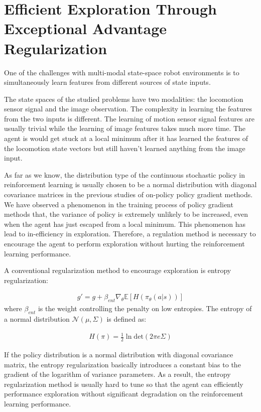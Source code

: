 \section{Efficient Exploration Through Exceptional Advantage Regularization}\label{sec_method_expadv_reg}
One of the challenges with multi-modal state-space robot environments is to simultaneously learn features from different sources of state inputs.

The state spaces of the studied problems have two modalities: the locomotion sensor signal and the image observation. The complexity in learning the features from the two inputs is different. The learning of motion sensor signal features are usually trivial while the learning of image features takes much more time. The agent is would get stuck at a local minimum after it has learned the features of the locomotion state vectors but still haven't learned anything from the image input.

As far as we know, the distribution type of the continuous stochastic policy in reinforcement learning is usually chosen to be a normal distribution with diagonal covariance matrices in the previous studies of on-policy policy gradient methods. We have observed a phenomenon in the training process of policy gradient methods that, the variance of policy is extremely unlikely to be increased, even when the agent has just escaped from a local minimum. This phenomenon has lead to in-efficiency in exploration. Therefore, a regulation method is necessary to encourage the agent to perform exploration without hurting the reinforcement learning performance.

A conventional regularization method to encourage exploration is entropy regularization:

\begin{align}
g' = g +\beta_{ent}\nabla_\theta \mathbb{E}[ H(\pi_\theta(a|s)) ]
\end{align}
where $\beta_{ent}$ is the weight controlling the penalty on low entropies.
The entropy of a normal distribution $\mathcal{N}(\mu,\Sigma)$ is defined as:

\begin{align}
	H(\pi) =  \frac{1}{2} \ln \mathrm{det}(2\pi e \Sigma)
\end{align}

If the policy distribution is a normal distribution with diagonal covariance matrix, the entropy regularization basically introduces a constant bias to the gradient of the logarithm of variance parameters. As a result, the entropy regularization method is usually hard to tune so that the agent can efficiently performance exploration without significant degradation on the reinforcement learning performance.


